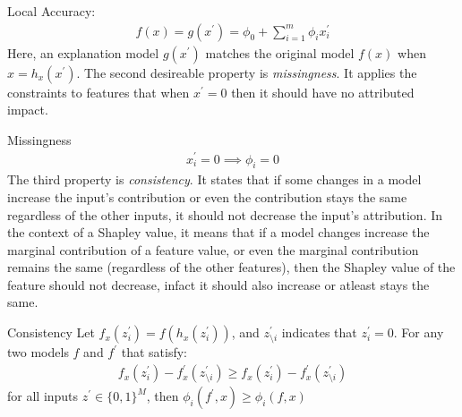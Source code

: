 \documentclass[english]{tktltiki2}
\theoremstyle{definition}
\theoremstyle{remark}
\begin{document}
\begin{properties} \label{prop:all_properties}
\item Local Accuracy:
\begin{align*}
	f(x) = g(x^\prime) =  \phi_0 + \sum_{i=1}^{m} \phi_i x_i^\prime 
\end{align*}
Here, an explanation model $g(x^\prime)$ matches the original model $f(x)$ when $x = h_x(x^\prime)$.
The second desireable property is \textit{missingness}. It applies the constraints to features that when $x^\prime = 0$ then it should have no attributed impact.
\item Missingness
\begin{align*}
	x_i^\prime = 0 \implies \phi_i = 0
\end{align*}
The third property is \textit{consistency}. It states that if some changes in a model increase the input's contribution or even the contribution stays the same regardless of the other inputs, it should not decrease the input's attribution. In the context of a Shapley value, it means that if a model changes increase the marginal contribution of a feature value, or even the marginal contribution remains the same (regardless of the other features), then the Shapley value of the feature should not decrease, infact it should also increase or atleast stays the same.

\item Consistency
Let $f_x(z_i^\prime) = f(h_x(z_i^\prime))$, and $z^\prime_{\setminus i}$ indicates that $z^\prime_i = 0$. For any two models $f$ and $f^\prime$ that satisfy:
\begin{align*}
	f_x(z_i^\prime) - f^\prime_x(z^\prime_{\setminus i}) \geq f_x(z_i^\prime) - f^\prime_x(z^\prime_{\setminus i})
\end{align*}
for all inputs $z^\prime \in \{0,1\}^{M}$, then $\phi_i(f^\prime, x) \geq \phi_i(f, x)$
\end{properties}
\end{document}
